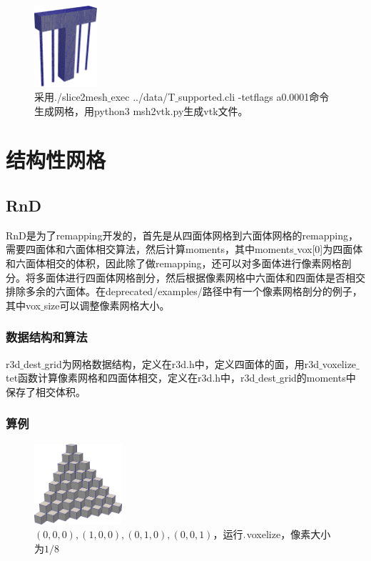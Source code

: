 \begin{figure}[!htbp]
  \centering
  \includegraphics[height=3cm]{fig/1/1.1.7.2:5.png}
  \caption{采用./slice2mesh$\_$exec ../data/T$\_$supported.cli -tetflags a0.0001命令生成网格，用python3 msh2vtk.py生成vtk文件。}
  \label{fig:1-7}
\end{figure}


\section{结构性网格}

\subsection{RnD}

RnD是为了remapping开发的，首先是从四面体网格到六面体网格的remapping，需要四面体和六面体相交算法，然后计算moments，其中moments$\_$vox[0]为四面体和六面体相交的体积，因此除了做remapping，还可以对多面体进行像素网格剖分。将多面体进行四面体网格剖分，然后根据像素网格中六面体和四面体是否相交排除多余的六面体。在deprecated/examples/路径中有一个像素网格剖分的例子，其中vox$\_$size可以调整像素网格大小。

\subsubsection{数据结构和算法}
r3d$\_$dest$\_$grid为网格数据结构，定义在r3d.h中，定义四面体的面，用r3d$\_$voxelize$\_$tet函数计算像素网格和四面体相交，定义在r3d.h中，r3d$\_$dest$\_$grid的moments中保存了相交体积。

\subsubsection{算例}

\begin{figure}[!htbp]
  \centering
  \includegraphics[height=3cm]{fig/1/1.2/1.png}
  \caption{$(0,0,0),(1,0,0),(0,1,0),(0,0,1)$，运行$.\\$voxelize，像素大小为$1/8$}
  \label{fig:1-7}
\end{figure}

